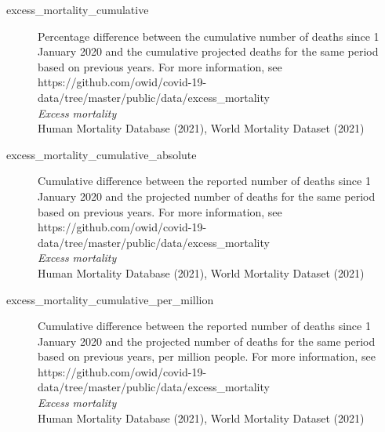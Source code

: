 \begin{description}
    \item[excess\_mortality\_cumulative] 
    Percentage difference between the cumulative number of deaths since 1 January 2020 and the cumulative projected deaths for the same period based on previous years. For more information, see https://github.com/owid/covid-19-data/tree/master/public/data/excess\_mortality\\
    \emph{\footnotesize{Excess mortality}}\\
    \footnotesize{Human Mortality Database (2021), World Mortality Dataset (2021)}\\

    \item[excess\_mortality\_cumulative\_absolute] 
    Cumulative difference between the reported number of deaths since 1 January 2020 and the projected number of deaths for the same period based on previous years. For more information, see https://github.com/owid/covid-19-data/tree/master/public/data/excess\_mortality\\
    \emph{\footnotesize{Excess mortality}}\\
    \footnotesize{Human Mortality Database (2021), World Mortality Dataset (2021)}\\

    \item[excess\_mortality\_cumulative\_per\_million] 
    Cumulative difference between the reported number of deaths since 1 January 2020 and the projected number of deaths for the same period based on previous years, per million people. For more information, see https://github.com/owid/covid-19-data/tree/master/public/data/excess\_mortality\\
    \emph{\footnotesize{Excess mortality}}\\
    \footnotesize{Human Mortality Database (2021), World Mortality Dataset (2021)}\\

\end{description}